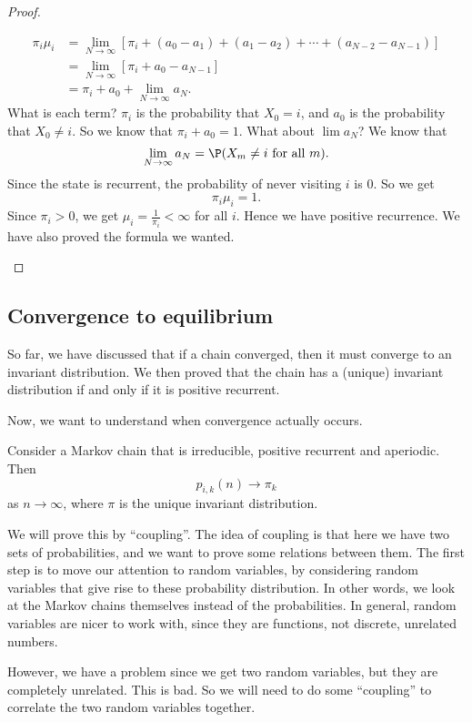 \documentclass[a4paper]{article}
\begin{document}
\begin{proof}
\begin{enumerate}
\begin{align*}
        \pi_i \mu_i &= \lim_{N \to \infty} [\pi_i + (a_0 - a_1) + (a_1 - a_2) + \cdots + (a_{N - 2} - a_{N - 1})]\\
        &= \lim_{N\to \infty} [\pi_i + a_0 - a_{N - 1}]\\
        &= \pi_i + a_0 + \lim_{N \to \infty} a_N.
      \end{align*}
      What is each term? $\pi_i$ is the probability that $X_0 = i$, and $a_0$ is the probability that $X_0 \not= i$. So we know that $\pi_i + a_0 = 1$. What about $\lim a_N$? We know that
      \[
        \lim_{N\to \infty} a_N = \P(X_m \not= i \text{ for all }m).
      \]
      Since the state is recurrent, the probability of never visiting $i$ is $0$. So we get
      \[
        \pi_i \mu_i = 1.
      \]
      Since $\pi_i > 0$, we get $\mu_i = \frac{1}{\pi_i} < \infty$ for all $i$. Hence we have positive recurrence. We have also proved the formula we wanted.
  \end{enumerate}
\end{proof}
\subsection{Convergence to equilibrium}
So far, we have discussed that if a chain converged, then it must converge to an invariant distribution. We then proved that the chain has a (unique) invariant distribution if and only if it is positive recurrent.

Now, we want to understand when convergence actually occurs.
\begin{thm}
  Consider a Markov chain that is irreducible, positive recurrent and aperiodic. Then
  \[
    p_{i,k}(n) \to \pi_k
  \]
  as $n \to \infty$, where $\pi$ is the unique invariant distribution.
\end{thm}
We will prove this by ``coupling''. The idea of coupling is that here we have two sets of probabilities, and we want to prove some relations between them. The first step is to move our attention to random variables, by considering random variables that give rise to these probability distribution. In other words, we look at the Markov chains themselves instead of the probabilities. In general, random variables are nicer to work with, since they are functions, not discrete, unrelated numbers.

However, we have a problem since we get two random variables, but they are completely unrelated. This is bad. So we will need to do some ``coupling'' to correlate the two random variables together.
\end{document}
